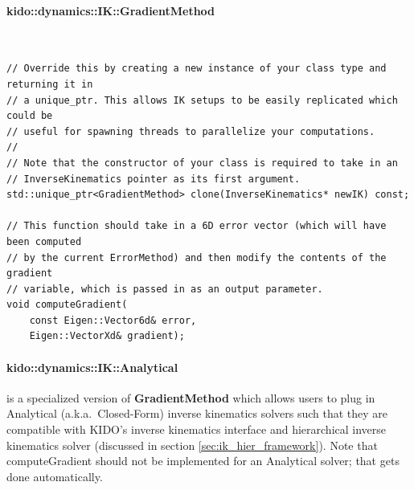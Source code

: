 \paragraph{kido::dynamics::IK::GradientMethod} \
\begin{lstlisting}
// Override this by creating a new instance of your class type and returning it in
// a unique_ptr. This allows IK setups to be easily replicated which could be 
// useful for spawning threads to parallelize your computations.
//
// Note that the constructor of your class is required to take in an 
// InverseKinematics pointer as its first argument.
std::unique_ptr<GradientMethod> clone(InverseKinematics* newIK) const;

// This function should take in a 6D error vector (which will have been computed
// by the current ErrorMethod) and then modify the contents of the gradient 
// variable, which is passed in as an output parameter.
void computeGradient(
    const Eigen::Vector6d& error,
    Eigen::VectorXd& gradient);
\end{lstlisting}

\paragraph{kido::dynamics::IK::Analytical} is a specialized version of \textbf{GradientMethod} which allows users to plug in Analytical (a.k.a.\ Closed-Form) inverse kinematics solvers such that they are compatible with KIDO's inverse kinematics interface and hierarchical inverse kinematics solver (discussed in section \ref{sec:ik_hier_framework}). Note that computeGradient should not be implemented for an Analytical solver; that gets done automatically.

